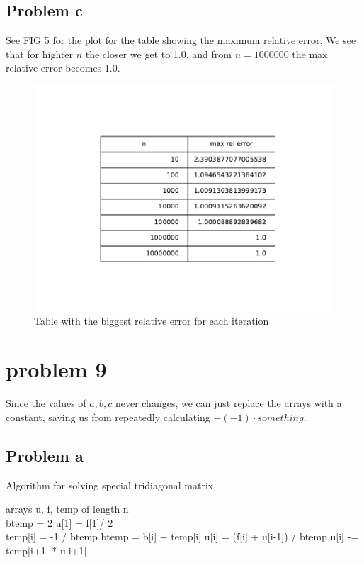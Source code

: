 \documentclass[english,notitlepage]{revtex4-1}  %
\begin{document}
	\subsection*{Problem c}
	See FIG 5 for the plot for the table showing the maximum relative error. We see that for highter $n$ the closer we get to 1.0, and from $n = 1 000 000$ the max relative error becomes 1.0.
		\begin{figure}[H]
			\centering
			\includegraphics[scale=0.75]{plots/biggest_rel_err.pdf} %
			\caption{Table with the biggest relative error for each iteration}
			\label{fig:biggest_rel_err}
		\end{figure}


\section*{problem 9}
	Since the values of $a,b,c$ never changes, we can just replace the arrays with a constant, saving us from repeatedly calculating $- (-1)\cdot{something}$.
	\subsection*{Problem a}
		\begin{algorithm}[H]
			\caption{Algorithm for solving special tridiagonal matrix}
			\begin{algorithmic}
				\State arrays u, f, temp of length n
				\\
				\State btemp = 2
				\State u[1] = f[1]/ 2
				\\
				\State temp[i] = -1 / btemp
				\State btemp = b[i] + temp[i]
				\State u[i] = (f[i] + u[i-1]) / btemp
				\EndFor
				\State u[i] -= temp[i+1] * u[i+1]
				\EndFor
			\end{algorithmic}
		\end{algorithm}
\end{document}
